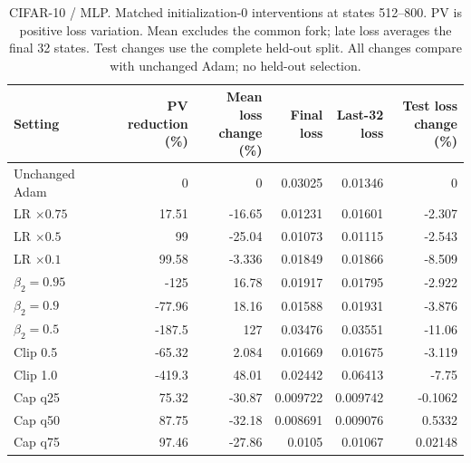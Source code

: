 \begin{table}[H]
\centering
\small
\setlength{\tabcolsep}{4pt}
\begin{tabular}{lrrrrr}
\toprule
Setting & \shortstack{PV reduction\\(\%)} & \shortstack{Mean loss\\change (\%)} & \shortstack{Final\\loss} & \shortstack{Last-32\\loss} & \shortstack{Test loss\\change (\%)} \\
\midrule
Unchanged Adam & 0 & 0 & 0.03025 & 0.01346 & 0 \\
LR $\times0.75$ & 17.51 & -16.65 & 0.01231 & 0.01601 & -2.307 \\
LR $\times0.5$ & 99 & -25.04 & 0.01073 & 0.01115 & -2.543 \\
LR $\times0.1$ & 99.58 & -3.336 & 0.01849 & 0.01866 & -8.509 \\
$\beta_2=0.95$ & -125 & 16.78 & 0.01917 & 0.01795 & -2.922 \\
$\beta_2=0.9$ & -77.96 & 18.16 & 0.01588 & 0.01931 & -3.876 \\
$\beta_2=0.5$ & -187.5 & 127 & 0.03476 & 0.03551 & -11.06 \\
Clip 0.5 & -65.32 & 2.084 & 0.01669 & 0.01675 & -3.119 \\
Clip 1.0 & -419.3 & 48.01 & 0.02442 & 0.06413 & -7.75 \\
Cap q25 & 75.32 & -30.87 & 0.009722 & 0.009742 & -0.1062 \\
Cap q50 & 87.75 & -32.18 & 0.008691 & 0.009076 & 0.5332 \\
Cap q75 & 97.46 & -27.86 & 0.0105 & 0.01067 & 0.02148 \\
\bottomrule
\end{tabular}
\caption{CIFAR-10 / MLP. Matched initialization-0 interventions at states 512--800. PV is positive loss variation. Mean excludes the common fork; late loss averages the final 32 states. Test changes use the complete held-out split. All changes compare with unchanged Adam; no held-out selection.}
\end{table}

